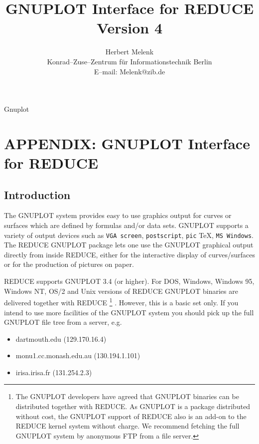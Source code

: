 \newpage
  Gnuplot
\newpage
\title{GNUPLOT Interface for REDUCE\\Version 4}
\author{Herbert Melenk \\ 
Konrad--Zuse--Zentrum f\"ur Informationstechnik Berlin \\
E--mail: Melenk@zib.de}
\maketitle


\section{APPENDIX: GNUPLOT Interface for REDUCE}

\subsection{Introduction}

The GNUPLOT system provides easy to use graphics output 
for curves or surfaces which are defined by  
formulas and/or data sets. GNUPLOT supports 
a variety of output devices such as
\verb+VGA screen+, \verb+postscript+, \verb+pic+ \TeX,
\verb+MS Windows+.
The {\small REDUCE} GNUPLOT package lets one use the GNUPLOT
graphical output directly from inside {\small REDUCE}, either for
the interactive display of curves/surfaces or for the production
of pictures on paper. 

{\small REDUCE} supports GNUPLOT 3.4 (or higher). 
For  DOS, Windows, Windows 95, Windows NT, OS/2
and Unix versions of {\small REDUCE}
GNUPLOT binaries are delivered together with {\small REDUCE}
\footnote{The GNUPLOT developers have agreed that GNUPLOT
binaries can be distributed together with {\small REDUCE}.
As GNUPLOT is a package distributed without cost,
the GNUPLOT support of {\small REDUCE} also is an
add-on to the {\small REDUCE} kernel system without charge.
We recommend fetching the full GNUPLOT system 
by anonymous FTP from a file server.
} %
. However, this is a basic set only. 
If you intend to use more facilities of the GNUPLOT
system you should pick up the full GNUPLOT file tree
from a server, e.g.

\begin{itemize}
\item dartmouth.edu (129.170.16.4)
\item monu1.cc.monash.edu.au (130.194.1.101)
\item irisa.irisa.fr (131.254.2.3)
\end{itemize}


